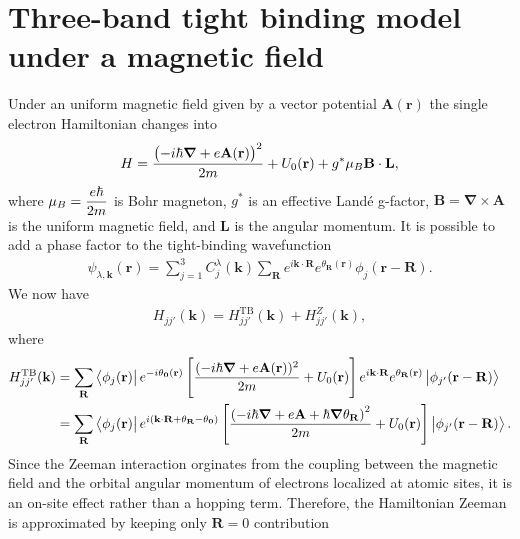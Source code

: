 \section{Three-band tight binding model under a magnetic field}\label{Section 3.2}
Under an uniform magnetic field given by a vector potential $\mathbf{A}(\mathbf{r})$ the single electron Hamiltonian changes into
\begin{gather}
	H = \dfrac{\left(-i\hbar \boldsymbol{\nabla} + e \mathbf{A(r)}\right)^{2}}{2m} + U_{0}(\mathbf{r}) + g^{*} \mu_{B} \mathbf{B} \cdot \mathbf{L},
\end{gather}
where $\mu_{B} = \dfrac{e\hbar}{2m}$ is Bohr magneton, $g^{*}$ is an effective Landé g-factor, $\mathbf{B} = \boldsymbol{\nabla} \times  \mathbf{A}$ is the uniform magnetic field, and $\mathbf{L}$ is the angular momentum. It is possible to add a phase factor to the tight-binding wavefunction
\begin{gather}
	\psi_{\lambda,\mathbf{k}} (\mathbf{r}) = \sum_{j=1}^{3} C_{j}^{\lambda}(\mathbf{k}) \sum_{\mathbf{R}} e^{i\mathbf{k \cdot R}} e^{ \theta_{\mathbf{R}}(\mathbf{r})} \phi_{j}(\mathbf{r} - \mathbf{R}).
\end{gather}
We now have
\begin{equation}
	\begin{aligned}
		H_{j j'} (\mathbf{k}) = H_{jj'}^{\text{TB}}(\mathbf{k}) + H_{jj'}^{Z}(\mathbf{k}),
	\end{aligned}
\end{equation}
where
\begin{equation}
	\begin{aligned}
		H_{jj'}^{\text{TB}}(\mathbf{k})
		& = \sum_{\mathbf{R}} \bra{\phi_{j}(\mathbf{r})} e^{-i \theta_{\mathbf{0}}(\mathbf{r})} \left[\dfrac{(-i\hbar \boldsymbol{\nabla} + e \mathbf{A}(\mathbf{r}))^{2}}{2m} + U_{0}(\mathbf{r}) \right] e^{i\mathbf{k \cdot R}} e^{ \theta_{\mathbf{R}}(\mathbf{r})} \ket{\phi_{j'}(\mathbf{r - R})}                        \\
		& = \sum_{\mathbf{R}} \bra{\phi_{j}(\mathbf{r})} e^{i(\mathbf{k \cdot R} +\theta_{\mathbf{R}} - \theta_{\mathbf{0}} )} \left[ \dfrac{ \left( -i\hbar \boldsymbol{\nabla} + e \mathbf{A} + \hbar \boldsymbol{\nabla} \theta_{\mathbf{R}} \right)^{2} }{2m} + U_{0}(\mathbf{r}) \right] \ket{\phi_{j'}(\mathbf{r - R})}.
	\end{aligned}
\end{equation}
Since the Zeeman interaction orginates from the coupling between the magnetic field and the orbital angular momentum of electrons localized at atomic sites, it is an on-site effect rather than a hopping term. Therefore, the Hamiltonian Zeeman is approximated by keeping only $\mathbf{R} = 0$ contribution
